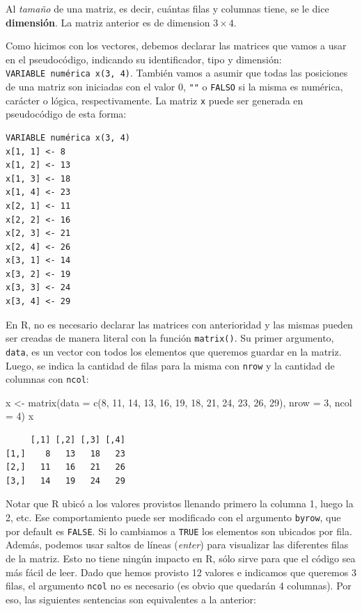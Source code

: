 \documentclass[
]{book}
\newenvironment{Shaded}{\begin{snugshade}}{\end{snugshade}}
\newcommand{\AttributeTok}[1]{\textcolor[rgb]{0.77,0.63,0.00}{#1}}
\newcommand{\DecValTok}[1]{\textcolor[rgb]{0.00,0.00,0.81}{#1}}
\newcommand{\FunctionTok}[1]{\textcolor[rgb]{0.00,0.00,0.00}{#1}}
\newcommand{\NormalTok}[1]{#1}
\newcommand{\OtherTok}[1]{\textcolor[rgb]{0.56,0.35,0.01}{#1}}
\begin{document}
Al \emph{tamaño} de una matriz, es decir, cuántas filas y columnas tiene, se le dice \textbf{dimensión}. La matriz anterior es de dimension \(3 \times 4\).

Como hicimos con los vectores, debemos declarar las matrices que vamos a usar en el pseudocódigo, indicando su identificador, tipo y dimensión: \texttt{VARIABLE\ numérica\ x(3,\ 4)}. También vamos a asumir que todas las posiciones de una matriz son iniciadas con el valor 0, \texttt{""} o \texttt{FALSO} si la misma es numérica, carácter o lógica, respectivamente. La matriz \texttt{x} puede ser generada en pseudocódigo de esta forma:

\begin{verbatim}
VARIABLE numérica x(3, 4)
x[1, 1] <- 8
x[1, 2] <- 13
x[1, 3] <- 18
x[1, 4] <- 23
x[2, 1] <- 11
x[2, 2] <- 16
x[2, 3] <- 21
x[2, 4] <- 26
x[3, 1] <- 14
x[3, 2] <- 19
x[3, 3] <- 24
x[3, 4] <- 29
\end{verbatim}

En R, no es necesario declarar las matrices con anterioridad y las mismas pueden ser creadas de manera literal con la función \texttt{matrix()}. Su primer argumento, \texttt{data}, es un vector con todos los elementos que queremos guardar en la matriz. Luego, se indica la cantidad de filas para la misma con \texttt{nrow} y la cantidad de columnas con \texttt{ncol}:

\begin{Shaded}
\begin{Highlighting}[]
\NormalTok{x }\OtherTok{\textless{}{-}} \FunctionTok{matrix}\NormalTok{(}\AttributeTok{data =} \FunctionTok{c}\NormalTok{(}\DecValTok{8}\NormalTok{, }\DecValTok{11}\NormalTok{, }\DecValTok{14}\NormalTok{, }\DecValTok{13}\NormalTok{, }\DecValTok{16}\NormalTok{, }\DecValTok{19}\NormalTok{, }\DecValTok{18}\NormalTok{, }\DecValTok{21}\NormalTok{, }\DecValTok{24}\NormalTok{, }\DecValTok{23}\NormalTok{, }\DecValTok{26}\NormalTok{, }\DecValTok{29}\NormalTok{),}
            \AttributeTok{nrow =} \DecValTok{3}\NormalTok{, }\AttributeTok{ncol =} \DecValTok{4}\NormalTok{)}
\NormalTok{x}
\end{Highlighting}
\end{Shaded}

\begin{verbatim}
     [,1] [,2] [,3] [,4]
[1,]    8   13   18   23
[2,]   11   16   21   26
[3,]   14   19   24   29
\end{verbatim}

Notar que R ubicó a los valores provistos llenando primero la columna 1, luego la 2, etc. Ese comportamiento puede ser modificado con el argumento \texttt{byrow}, que por default es \texttt{FALSE}. Si lo cambiamos a \texttt{TRUE} los elementos son ubicados por fila. Además, podemos usar saltos de líneas (\emph{enter}) para visualizar las diferentes filas de la matriz. Esto no tiene ningún impacto en R, sólo sirve para que el código sea más fácil de leer. Dado que hemos provisto 12 valores e indicamos que queremos 3 filas, el argumento \texttt{ncol} no es necesario (es obvio que quedarán 4 columnas). Por eso, las siguientes sentencias son equivalentes a la anterior:
\end{document}
